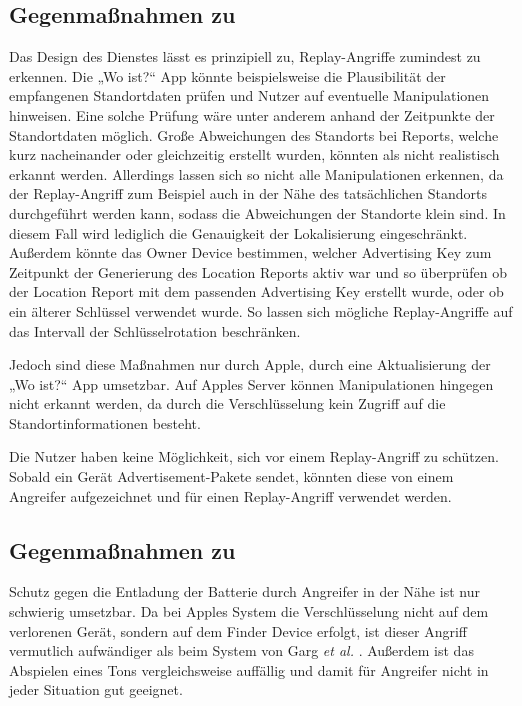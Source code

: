 \subsection{Gegenmaßnahmen zu }
Das Design des Dienstes lässt es prinzipiell zu, Replay-Angriffe zumindest zu erkennen.
Die „Wo ist?“ App könnte beispielsweise die Plausibilität der empfangenen Standortdaten prüfen und Nutzer auf eventuelle Manipulationen hinweisen.
Eine solche Prüfung wäre unter anderem anhand der Zeitpunkte der Standortdaten möglich.
Große Abweichungen des Standorts bei Reports, welche kurz nacheinander oder gleichzeitig erstellt wurden, könnten als nicht realistisch erkannt werden.
Allerdings lassen sich so nicht alle Manipulationen erkennen, da der Replay-Angriff zum Beispiel auch in der Nähe des tatsächlichen Standorts durchgeführt werden kann, sodass die Abweichungen der Standorte klein sind.
In diesem Fall wird lediglich die Genauigkeit der Lokalisierung eingeschränkt.
Außerdem könnte das Owner Device bestimmen, welcher Advertising Key zum Zeitpunkt der Generierung des Location Reports aktiv war und so überprüfen ob der Location Report mit dem passenden Advertising Key erstellt wurde, oder ob ein älterer Schlüssel verwendet wurde.
So lassen sich mögliche Replay-Angriffe auf das Intervall der Schlüsselrotation beschränken.

Jedoch sind diese Maßnahmen nur durch Apple, durch eine Aktualisierung der „Wo ist?“ App umsetzbar. 
Auf Apples Server können Manipulationen hingegen nicht erkannt werden, da durch die Verschlüsselung kein Zugriff auf die Standortinformationen besteht.

Die Nutzer haben keine Möglichkeit, sich vor einem Replay-Angriff zu schützen.
Sobald ein Gerät Advertisement-Pakete sendet, könnten diese von einem Angreifer aufgezeichnet und für einen Replay-Angriff verwendet werden.


\subsection{Gegenmaßnahmen zu }

Schutz gegen die Entladung der Batterie durch Angreifer in der Nähe ist nur schwierig umsetzbar.
Da bei Apples System die Verschlüsselung nicht auf dem verlorenen Gerät, sondern auf dem Finder Device erfolgt, ist dieser Angriff vermutlich aufwändiger als beim System von Garg \textit{et al.} \cite{Garg_Secure_Tracker}.
Außerdem ist das Abspielen eines Tons vergleichsweise auffällig und damit für Angreifer nicht in jeder Situation gut geeignet.

